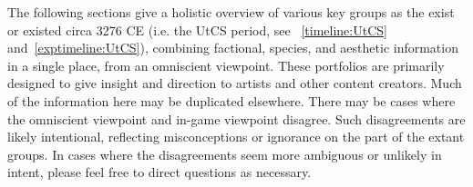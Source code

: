 \label{chapt:portfolios}
The following sections give a holistic overview of various key groups
as the exist or existed circa 3276 CE (i.e. the UtCS period, see
~\ref{timeline:UtCS} and~\ref{exptimeline:UtCS}), combining factional, species, and aesthetic
information in a single place, from an omniscient viewpoint. These
portfolios are primarily designed to give insight and direction to
artists and other content creators. Much of the information here may
be duplicated elsewhere. There may be cases where the omniscient
viewpoint and in-game viewpoint disagree. Such disagreements are
likely intentional, reflecting misconceptions or ignorance on the
part of the extant groups. In cases where the disagreements seem more
ambiguous or unlikely in intent, please feel free to direct questions
as necessary.



%

